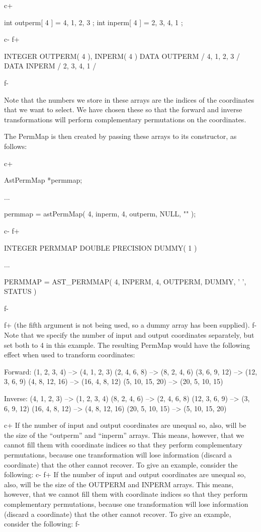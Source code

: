 \documentclass[twoside,11pt]{starlink}
\begin{document}
c+
\small
\begin{terminalv}
int outperm[ 4 ] = { 4, 1, 2, 3 };
int inperm[ 4 ] = { 2, 3, 4, 1 };
\end{terminalv}
\normalsize
c-
f+
\small
\begin{terminalv}
      INTEGER OUTPERM( 4 ), INPERM( 4 )
      DATA OUTPERM / 4, 1, 2, 3 /
      DATA INPERM / 2, 3, 4, 1 /
\end{terminalv}
\normalsize
f-

Note that the numbers we store in these arrays are the indices of the
coordinates that we want to select. We have chosen these so that the
forward and inverse transformations will perform complementary
permutations on the coordinates.

The PermMap is then created by passing these arrays to its
constructor, as follows:

c+
\small
\begin{terminalv}
AstPermMap *permmap;

...

permmap = astPermMap( 4, inperm, 4, outperm, NULL, "" );
\end{terminalv}
\normalsize
c-
f+
\small
\begin{terminalv}
      INTEGER PERMMAP
      DOUBLE PRECISION DUMMY( 1 )

      ...

      PERMMAP = AST_PERMMAP( 4, INPERM, 4, OUTPERM, DUMMY, ' ', STATUS )
\end{terminalv}
\normalsize
f-

f+
(the fifth argument is not being used, so a dummy array has been supplied).
f-
Note that we specify the number of input and output coordinates
separately, but set both to 4 in this example. The resulting PermMap
would have the following effect when used to transform coordinates:

\begin{terminalv}
Forward:
   (1, 2, 3, 4) --> (4, 1, 2, 3)
   (2, 4, 6, 8) --> (8, 2, 4, 6)
   (3, 6, 9, 12) --> (12, 3, 6, 9)
   (4, 8, 12, 16) --> (16, 4, 8, 12)
   (5, 10, 15, 20) --> (20, 5, 10, 15)

Inverse:
   (4, 1, 2, 3) --> (1, 2, 3, 4)
   (8, 2, 4, 6) --> (2, 4, 6, 8)
   (12, 3, 6, 9) --> (3, 6, 9, 12)
   (16, 4, 8, 12) --> (4, 8, 12, 16)
   (20, 5, 10, 15) --> (5, 10, 15, 20)
\end{terminalv}

c+
If the number of input and output coordinates are unequal so, also,
will be the size of the ``outperm'' and ``inperm'' arrays. This means,
however, that we cannot fill them with coordinate indices so that they
perform complementary permutations, because one transformation will
lose information (discard a coordinate) that the other cannot recover.
To give an example, consider the following:
c-
f+
If the number of input and output coordinates are unequal so, also,
will be the size of the OUTPERM and INPERM arrays. This means,
however, that we cannot fill them with coordinate indices so that they
perform complementary permutations, because one transformation will
lose information (discard a coordinate) that the other cannot recover.
To give an example, consider the following:
f-
\end{document}
